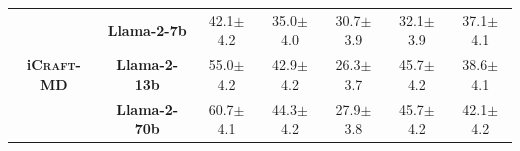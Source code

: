 \begin{table}[h!]
{\begin{tabular}{ccccccc}
    \midrule
    \multirow{3}{*}{\textbf{i\textsc{Craft-MD}}} 
    & \small\textbf{Llama-2-7b}\normalsize & 42.1\scriptsize$\pm$4.2\normalsize & 35.0\scriptsize$\pm$4.0\normalsize & 30.7\scriptsize$\pm$3.9\normalsize & 32.1\scriptsize$\pm$3.9\normalsize & 37.1\scriptsize$\pm$4.1\normalsize\\ 
    & \small\textbf{Llama-2-13b}\normalsize & 55.0\scriptsize$\pm$4.2\normalsize & 42.9\scriptsize$\pm$4.2\normalsize & 26.3\scriptsize$\pm$3.7\normalsize & 45.7\scriptsize$\pm$4.2\normalsize & 38.6\scriptsize$\pm$4.1\normalsize\\ 
    & \small\textbf{Llama-2-70b}\normalsize & 60.7\scriptsize$\pm$4.1\normalsize & 44.3\scriptsize$\pm$4.2\normalsize & 27.9\scriptsize$\pm$3.8\normalsize & 45.7\scriptsize$\pm$4.2\normalsize & 42.1\scriptsize$\pm$4.2\normalsize\\ 
    \bottomrule
    \end{tabular}}\vspace{2mm}
    \label{tab:llama2_baseline}\vspace{-5mm}
\end{table}


